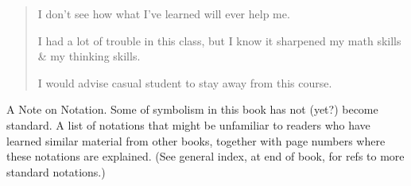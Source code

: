 \documentclass{article}
\begin{document}
\begin{enumerate}
\begin{quote}
		I don't see how what I've learned will ever help me.
		
		I had a lot of trouble in this class, but I know it sharpened my math skills \& my thinking skills.
		
		I would advise casual student to stay away from this course.
	\end{quote}
	{\sf A Note on Notation.} Some of symbolism in this book has not (yet?) become standard. A list of notations that might be unfamiliar to readers who have learned similar material from other books, together with page numbers where these notations are explained. (See general index, at end of book, for refs to more standard notations.)
\end{enumerate}
\end{document}
